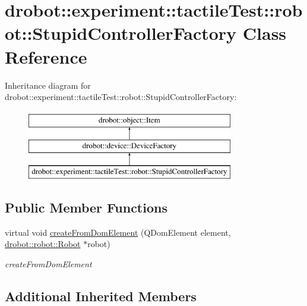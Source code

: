 \hypertarget{classdrobot_1_1experiment_1_1tactileTest_1_1robot_1_1StupidControllerFactory}{\section{drobot\-:\-:experiment\-:\-:tactile\-Test\-:\-:robot\-:\-:Stupid\-Controller\-Factory Class Reference}
\label{classdrobot_1_1experiment_1_1tactileTest_1_1robot_1_1StupidControllerFactory}
}
Inheritance diagram for drobot\-:\-:experiment\-:\-:tactile\-Test\-:\-:robot\-:\-:Stupid\-Controller\-Factory\-:\begin{figure}[H]
\begin{center}
\leavevmode
\includegraphics[height=3.000000cm]{classdrobot_1_1experiment_1_1tactileTest_1_1robot_1_1StupidControllerFactory}
\end{center}
\end{figure}
\subsection*{Public Member Functions}
\begin{DoxyCompactItemize}
\item 
virtual void \hyperlink{classdrobot_1_1experiment_1_1tactileTest_1_1robot_1_1StupidControllerFactory_aa5d84ac226f532590642a76a74e8df96}{create\-From\-Dom\-Element} (Q\-Dom\-Element element, \hyperlink{classdrobot_1_1robot_1_1Robot}{drobot\-::robot\-::\-Robot} $\ast$robot)
\begin{DoxyCompactList}\small\item\em create\-From\-Dom\-Element \end{DoxyCompactList}\end{DoxyCompactItemize}
\subsection*{Additional Inherited Members}


